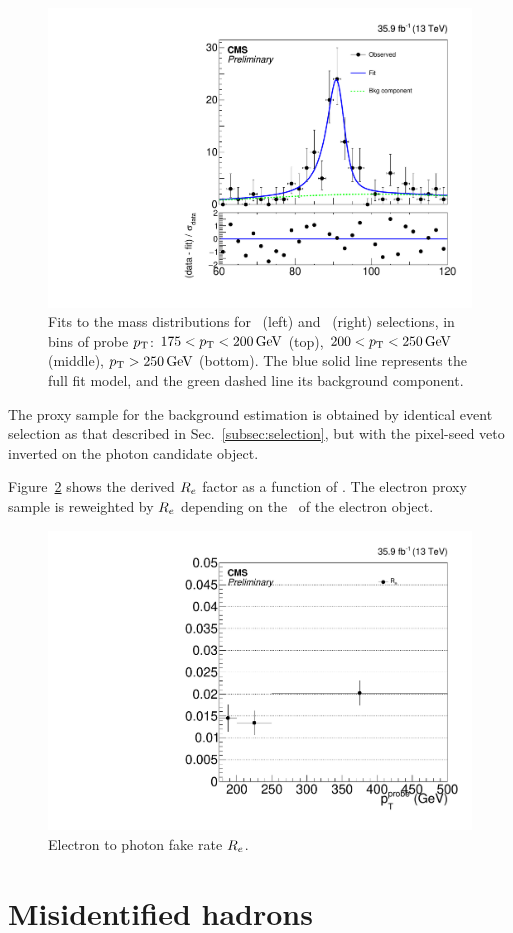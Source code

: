\begin{figure}[htbp]
\begin{center}
    \includegraphics[width=0.48\linewidth]{Analysis/Figures/fit_data_eg_pt_250_6500.pdf}
    \caption{
      Fits to the mass distributions for \Pe\Pe\ (left) and \Pe\Pgg\ (right) selections, in bins of probe $p_{\mathrm{T}}$: $175 < p_{\mathrm{T}} < 200\,\text{Ge\hspace{-.08em}V}$ (top), $200 < p_{\mathrm{T}} < 250\,\text{Ge\hspace{-.08em}V}$ (middle), $p_{\mathrm{T}} > 250\,\text{Ge\hspace{-.08em}V}$ (bottom). 
      The blue solid line represents the full fit model, and the green dashed line its background component.
    }
    \label{fig:efake_fits}
  \end{center}
\end{figure}

The proxy sample for the background estimation is obtained by identical event selection as that described in Sec.~\ref{subsec:selection}, but with the pixel-seed veto inverted on the photon candidate object.

Figure~\ref{fig:efake_frate} shows the derived $R_{{e}}$ factor as a function of \ETg. 
The electron proxy sample is reweighted by $R_{{e}}$ depending on the \pt\ of the electron object.

\begin{figure}[htbp]
  \begin{center}
    \includegraphics[width=0.48\linewidth]{Analysis/Figures/frate_data_ptalt.pdf} 
    \caption{
      Electron to photon fake rate $R_{{e}}$.
    }
    \label{fig:efake_frate}
  \end{center}
\end{figure}

\section{Misidentified hadrons}
\label{sec:hfake}

